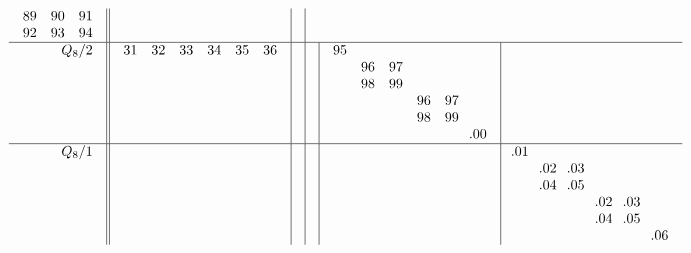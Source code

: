 \documentclass[11pt,a4paper]{amsart}
\begin{document}
\begin{align*}
\begin{array}{r||c|c|c|c|c}
\begin{array}{ccc}
      89&90&91\\
      92&93&94\\
    \end{array}
&& \\ \hline
    \begin{array}{r}
      Q_8/2 \\ \\ \\ \\ \\ \\
    \end{array}
&
  \begin{array}{cccccc}
31&32&33&34&35&36\\
&&&&&\\
&&&&&\\
&&&&&\\
&&&&&\\
&&&&&\\
  \end{array}
&&&
  \begin{array}{cccccc}
95&&&&&\\
&96&97&&&\\
&98&99&&&\\
&&&96&97&\\
&&&98&99&\\
&&&&&\llap.00\\
  \end{array}
& \\ \hline
    \begin{array}{r}
      Q_8/1 \\ \\ \\ \\ \\ \\
    \end{array}
&&&&&
      \begin{array}{cccccc}
\llap.01&&&&&\\
&\llap.02&\llap.03&&&\\
&\llap.04&\llap.05&&&\\
&&&\llap.02&\llap.03&\\
&&&\llap.04&\llap.05&\\
&&&&&\llap.06\\
      \end{array}
  \end{array}
\end{align*}
\end{document}
